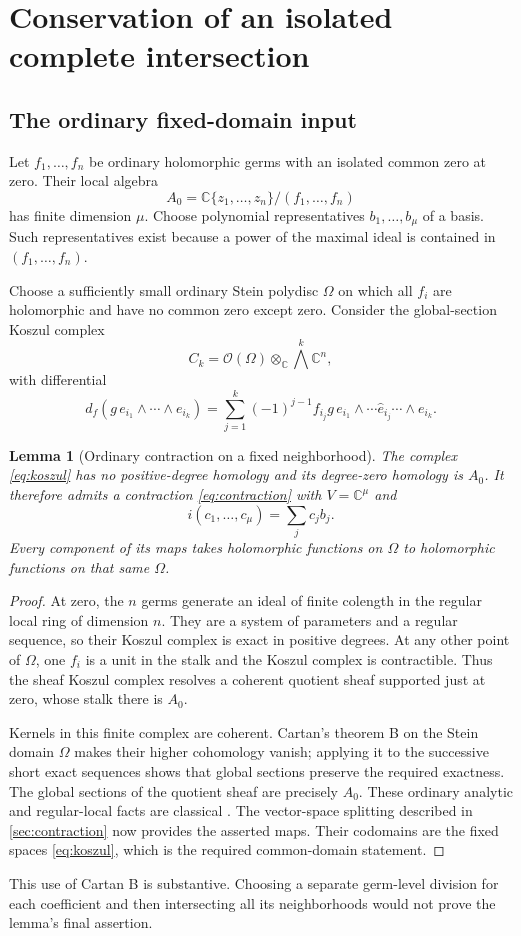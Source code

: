 \documentclass[11pt]{article}
\newtheorem{lemma}[theorem]{Lemma}
\theoremstyle{definition}
\newcommand{\C}{\mathbb C}
\newcommand{\OO}{\mathcal O}
\begin{document}
\section{Conservation of an isolated complete intersection}\label{sec:conservation}
\subsection{The ordinary fixed-domain input}
Let $f_1,\ldots,f_n$ be ordinary holomorphic germs with an isolated common zero at zero. Their local algebra
\[
 A_0=\C\{z_1,\ldots,z_n\}/(f_1,\ldots,f_n)
\]
has finite dimension $\mu$. Choose polynomial representatives $b_1,\ldots,b_\mu$ of a basis. Such representatives exist because a power of the maximal ideal is contained in $(f_1,\ldots,f_n)$.

Choose a sufficiently small ordinary Stein polydisc $\Omega$ on which all $f_i$ are holomorphic and have no common zero except zero. Consider the global-section Koszul complex
\begin{equation}\label{eq:koszul}
 C_k=\OO(\Omega)\otimes_\C\bigwedge^k\C^n,
\end{equation}
with differential
\[
 d_f(g\,e_{i_1}\wedge\cdots\wedge e_{i_k})
 =\sum_{j=1}^{k}(-1)^{j-1}f_{i_j}g\,
   e_{i_1}\wedge\cdots\widehat e_{i_j}\cdots\wedge e_{i_k}.
\]

\begin{lemma}[Ordinary contraction on a fixed neighborhood]\label{lem:ordinarykoszul}
The complex \eqref{eq:koszul} has no positive-degree homology and its degree-zero homology is $A_0$. It therefore admits a contraction \eqref{eq:contraction} with $V=\C^\mu$ and
\[
 i(c_1,\ldots,c_\mu)=\sum_jc_jb_j.
\]
Every component of its maps takes holomorphic functions on $\Omega$ to holomorphic functions on that same $\Omega$.
\end{lemma}
\begin{proof}
At zero, the $n$ germs generate an ideal of finite colength in the regular local ring of dimension $n$. They are a system of parameters and a regular sequence, so their Koszul complex is exact in positive degrees. At any other point of $\Omega$, one $f_i$ is a unit in the stalk and the Koszul complex is contractible. Thus the sheaf Koszul complex resolves a coherent quotient sheaf supported just at zero, whose stalk there is $A_0$.

Kernels in this finite complex are coherent. Cartan's theorem B on the Stein domain $\Omega$ makes their higher cohomology vanish; applying it to the successive short exact sequences shows that global sections preserve the required exactness. The global sections of the quotient sheaf are precisely $A_0$. These ordinary analytic and regular-local facts are classical \cite{GR,Stacks}. The vector-space splitting described in \cref{sec:contraction} now provides the asserted maps. Their codomains are the fixed spaces \eqref{eq:koszul}, which is the required common-domain statement.
\end{proof}
This use of Cartan B is substantive. Choosing a separate germ-level division for each coefficient and then intersecting all its neighborhoods would not prove the lemma's final assertion.
\end{document}
